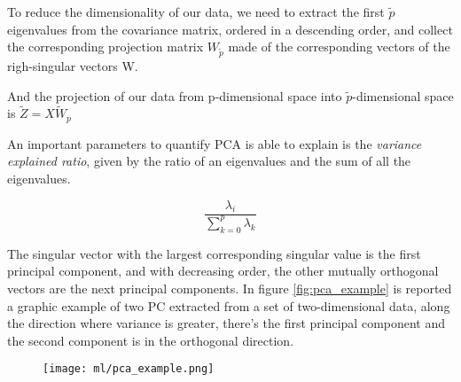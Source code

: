 \documentclass[a4paper,11pt]{article}
\begin{document}
To reduce the dimensionality of our data, we need to extract the first  $\tilde p$ eigenvalues from the covariance matrix, ordered in a descending order, and collect the corresponding projection matrix $W_{\tilde p}$ made of the corresponding vectors of the righ-singular vectors W.

And the projection of our data from p-dimensional space into $\tilde p$-dimensional space is $\tilde Z = X\tilde W_p$

An important parameters to quantify  PCA is able to explain is the \emph{variance explained ratio}, given by the ratio of an eigenvalues and the sum of all the eigenvalues.

\begin{equation}
\frac{\lambda_i}{\sum_{k = 0}^p \lambda_k}
\end{equation}

The singular vector with the largest corresponding singular value is the first principal component, and with decreasing order, the other mutually orthogonal vectors are the next principal components.
In figure \ref{fig:pca_example} is reported a graphic example of two PC extracted from a set of two-dimensional data, along the direction where variance is greater, there's the first principal component and the second component is in the orthogonal direction.

\begin{figure}[h]
\centering
\texttt{[image: ml/pca\_example.png]}
\caption{}
\label{}
\end{figure}



\end{document}
